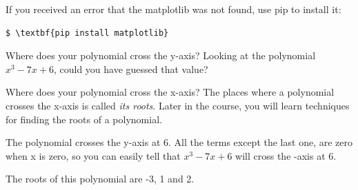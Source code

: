 If you received an error that the matplotlib was not found, use pip to install it:
\begin{Verbatim}[commandchars=\\\{\}]
$ \textbf{pip install matplotlib}
\end{Verbatim}

\begin{Exercise}[title={Observations}, label=plotobservations]
  Where does your polynomial cross the y-axis? Looking at the
  polynomial $x^3 - 7x + 6$, could you have guessed that value?

  \vspace{20mm}
  
  Where does your polynomial cross the x-axis? The places where a
  polynomial crosses the x-axis is called \emph{its roots}. Later in
  the course, you will learn techniques for finding the roots of a
  polynomial.
\end{Exercise}
\begin{Answer}[ref=plotobservations]
  The polynomial crosses the y-axis at 6. All the terms except the last one, are zero when x is zero, so you can easily tell that $x^3 - 7x + 6$ will cross the -axis at 6.

  The roots of this polynomial are -3, 1 and 2.
\end{Answer}
